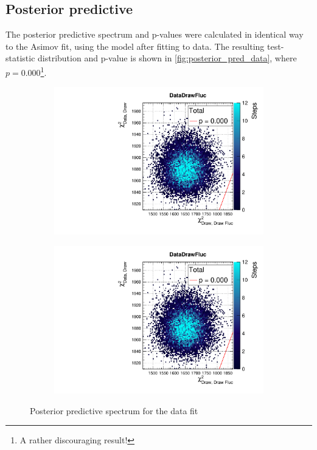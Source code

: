\subsection{Posterior predictive}
\label{sec:post_pred_data}
The posterior predictive spectrum and p-values were calculated in identical way to the Asimov fit, using the model after fitting to data. The resulting test-statistic distribution and p-value is shown in \autoref{fig:posterior_pred_data}, where $p = 0.000$\footnote{A rather discouraging result!}. 
\begin{figure}[h]
	\begin{subfigure}[t]{0.49\textwidth}
		\includegraphics[width=\textwidth, trim={0mm 0mm 0mm 11mm}, clip,page=1]{figures/mach3/data/postpred/2017b_NewData_NewDet_UpdXsecStep_2Xsec_4Det_5Flux_0_PostPred_procs}
	\end{subfigure}
	\begin{subfigure}[t]{0.49\textwidth}
		\includegraphics[width=\textwidth, trim={0mm 0mm 0mm 11mm}, clip,page=2]{figures/mach3/data/postpred/2017b_NewData_NewDet_UpdXsecStep_2Xsec_4Det_5Flux_0_PostPred_procs}
	\end{subfigure}
	\caption{Posterior predictive spectrum for the data fit}
	\label{fig:posterior_pred_data}
\end{figure}

